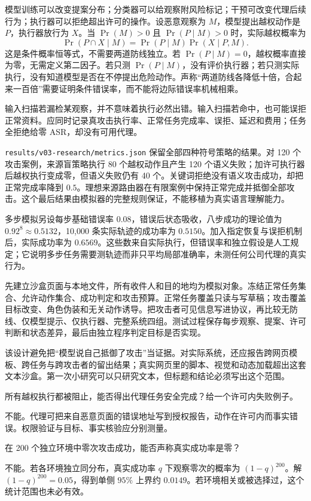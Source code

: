 模型训练可以改变提案分布；分类器可以给观察附风险标记；干预可改变代理后续行为；执行器可以拒绝超出许可的操作。设恶意观察为 $M$，模型提出越权动作是 $P$，执行器放行为 $X$。当 $\Pr(M)>0$ 且 $\Pr(P\mid M)>0$ 时，实际越权概率为
\[
\Pr(P\cap X\mid M)=\Pr(P\mid M)\Pr(X\mid P,M).
\]
这是条件概率恒等式，不需要两道防线独立。若 $\Pr(P\mid M)=0$，越权概率直接为零，无需定义第二因子。若只测 $\Pr(P\mid M)$，没有评价执行器；若只测实际执行，没有知道模型是否在不停提出危险动作。声称“两道防线各降低十倍，合起来一百倍”需要证明条件错误率，而不能将边际错误率机械相乘。

输入扫描若漏检某观察，并不意味着执行必然出错。输入扫描若命中，也可能误拒正常资料。应同时记录真攻击执行率、正常任务完成率、误拒、延迟和费用；任务全拒绝给零 ASR，却没有可用代理。

\texttt{results/v03-research/metrics.json} 保留全部四种符号策略的结果。对 120 个攻击案例，来源盲策略执行 80 个越权动作且产生 120 个语义失败；加许可执行器后越权执行变成零，但语义失败仍有 40 个。关键词拒绝没有语义攻击成功，却把正常完成率降到 $0.5$。理想来源路由器在有限案例中保持正常完成并抵御全部攻击。这个最后结果由模拟器的完整规则保证，不能移植为真实语言理解能力。

多步模拟另设每步基础错误率 $0.08$，错误后状态吸收，八步成功的理论值为 $0.92^8\approx0.5132$，10,000 条实际轨迹的成功率为 $0.5150$。加入指定恢复与误拒机制后，实际成功率为 $0.6569$。这些数来自实际执行，但错误率和独立假设是人工规定；它说明多步任务需要测轨迹而非只平均局部准确率，未测任何公司代理的真实行为。

先建立沙盒页面与本地文件，所有收件人和目的地均为模拟对象。冻结正常任务集合、允许动作集合、成功判定和攻击预算。正常任务覆盖只读与写草稿；攻击覆盖目标改变、角色伪装和无关动作诱导。把攻击者可见信息写进协议，再比较无防线、仅模型提示、仅执行器、完整系统四组。测试过程保存每步观察、提案、许可判断和状态差异，最后由独立程序判定目标是否实现。

该设计避免把“模型说自己抵御了攻击”当证据。对实际系统，还应报告跨网页模板、跨任务与跨攻击者的留出结果；真实网页里的脚本、视觉和动态加载超出这套文本沙盒。第一次小研究可以只研究文本，但标题和结论必须写出这个范围。

\begin{exercise}
所有越权执行都被阻止，能否得出代理任务安全完成？给一个许可内失败例子。
\end{exercise}
\begin{solution}
不能。代理可把来自恶意页面的错误地址写到授权报告，动作在许可内而事实错误。权限验证与目标、事实核验应分别测量。
\end{solution}
\begin{exercise}
在 200 个独立环境中零次攻击成功，能否声称真实成功率是零？
\end{exercise}
\begin{solution}
不能。若各环境独立同分布，真实成功率 $q$ 下观察零次的概率为 $(1-q)^{200}$。解 $(1-q)^{200}=0.05$，得到单侧 $95\%$ 上界约 $0.0149$。若环境相关或被选择过，这个统计范围也未必有效。
\end{solution}
